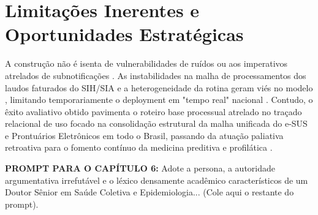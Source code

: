 \documentclass[12pt,openright,oneside,a4paper,brazil]{abntex2}
\begin{document}
\section{Limitações Inerentes e Oportunidades Estratégicas}
A construção não é isenta de vulnerabilidades de ruídos ou aos imperativos atrelados de subnotificações \cite{ref13}. As instabilidades na malha de processamentos dos laudos faturados do SIH/SIA e a heterogeneidade da rotina geram viés no modelo \cite{ref27}, limitando temporariamente o deployment em "tempo real" nacional \cite{ref44}. Contudo, o êxito avaliativo obtido pavimenta o roteiro base processual atrelado no traçado relacional de uso focado na consolidação estrutural da malha unificada do e-SUS e Prontuários Eletrônicos em todo o Brasil, passando da atuação paliativa retroativa para o fomento contínuo da medicina preditiva e profilática \cite{ref19, ref45}.

\begin{mdframed}[backgroundcolor=gray!10]
\textbf{PROMPT PARA O CAPÍTULO 6:} Adote a persona, a autoridade argumentativa irrefutável e o léxico densamente acadêmico característicos de um Doutor Sênior em Saúde Coletiva e Epidemiologia... (Cole aqui o restante do prompt).
\end{mdframed}


\end{document}
